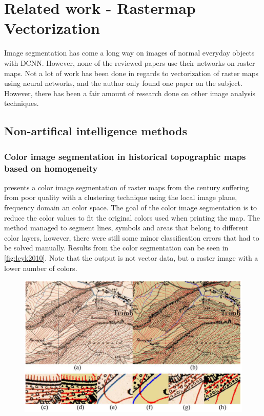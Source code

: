 \chapter{Related work - Rastermap Vectorization}
Image segmentation has come a long way on images of normal everyday objects with DCNN. However, none of the reviewed papers use their networks on raster maps. Not a lot of work has been done in regards to vectorization of raster maps using neural networks, and the author only found one paper on the subject. However, there has been a fair amount of research done on other image analysis techniques.

\section{Non-artifical intelligence methods}

\subsection{Color image segmentation in historical topographic maps based on homogeneity}
\citet{Leyk2010} presents a color image segmentation of raster maps from the  century suffering from poor quality with a clustering technique using the local image plane, frequency domain an color space. The goal of the color image segmentation is to reduce the color values to fit the original colors used when printing the map. The method managed to segment lines, symbols and areas that belong to different color layers, however, there were still some minor classification errors that had to be solved manually. Results from the color segmentation can be seen in \autoref{fig:leyk2010}. Note that the output is not vector data, but a raster image with a lower number of colors.

\begin{figure}[H]
    \centering
    \includegraphics[width=0.8\linewidth]{fig/leyk2010.png}
    \label{fig:leyk2010}
\end{figure}

